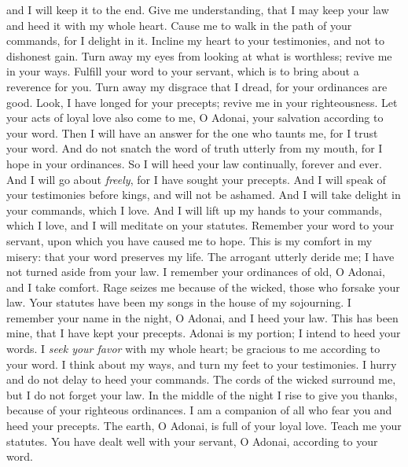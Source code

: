 \begin{biblechapter}
and I will keep it to the end.
\verse Give me understanding, that I may keep your law 
and heed it with my whole heart.
\verse Cause me to walk in the path of your commands, 
for I delight in it.
\verse Incline my heart to your testimonies, 
and not to dishonest gain.
\verse Turn away my eyes from looking at what is worthless; 
revive me in your ways.
\verse Fulfill your word to your servant, 
which is to bring about a reverence for you.
\verse Turn away my disgrace that I dread, 
for your ordinances are good.
\verse Look, I have longed for your precepts; 
revive me in your righteousness.
 Let your acts of loyal love also come to me, O Adonai, 
your salvation according to your word.
\verse Then I will have an answer for the one who taunts me, 
for I trust your word.
\verse And do not snatch the word of truth utterly from my mouth, 
for I hope in your ordinances.
\verse So I will heed your law continually, 
forever and ever.
\verse And I will go about \textit{freely}, 
for I have sought your precepts.
\verse And I will speak of your testimonies before kings, 
and will not be ashamed.
\verse And I will take delight in your commands, 
which I love.
\verse And I will lift up my hands to your commands, which I love, 
and I will meditate on your statutes.
 Remember your word to your servant, 
upon which you have caused me to hope.
\verse This is my comfort in my misery: 
that your word preserves my life.
\verse The arrogant utterly deride me; 
I have not turned aside from your law.
\verse I remember your ordinances of old, O Adonai, 
and I take comfort.
\verse Rage seizes me because of the wicked, 
those who forsake your law.
\verse Your statutes have been my songs 
in the house of my sojourning.
\verse I remember your name in the night, O Adonai, 
and I heed your law.
\verse This has been mine, 
that I have kept your precepts.
 Adonai is my portion; 
I intend to heed your words.
\verse I \textit{seek your favor} with my whole heart; 
be gracious to me according to your word.
\verse I think about my ways, 
and turn my feet to your testimonies.
\verse I hurry and do not delay 
to heed your commands.
\verse The cords of the wicked surround me, 
but I do not forget your law.
\verse In the middle of the night I rise to give you thanks, 
because of your righteous ordinances.
\verse I am a companion of all who fear you 
and heed your precepts.
\verse The earth, O Adonai, is full of your loyal love. 
Teach me your statutes.
 You have dealt well with your servant, 
O Adonai, according to your word.

\end{biblechapter}
